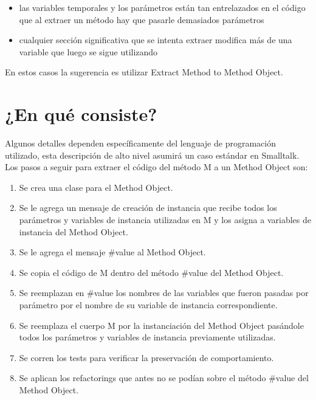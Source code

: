 \begin{itemize}
    \item las variables temporales y los parámetros están tan entrelazados en el código que al extraer 
    un método hay que pasarle demasiados parámetros
    \item cualquier sección significativa que se intenta extraer modifica más de una variable que
    luego se sigue utilizando
\end{itemize}

En estos casos la sugerencia es utilizar Extract Method to Method Object.


\section{¿En qué consiste?}

Algunos detalles dependen específicamente del lenguaje de programación utilizado, esta descripción
de alto nivel asumirá un caso estándar en Smalltalk. Los pasos a seguir para extraer el código
del método M a un Method Object son:

\begin{enumerate}
    \item Se crea una clase para el Method Object.
    \item Se le agrega un mensaje de creación de instancia que recibe todos los parámetros y
    variables de instancia utilizadas en M y los asigna a variables de instancia del Method Object.
    \item Se le agrega el mensaje \#value al Method Object.
    \item Se copia el código de M dentro del método \#value del Method Object.
    \item Se reemplazan en \#value los nombres de las variables que fueron pasadas por parámetro
    por el nombre de su variable de instancia correspondiente.
    \item Se reemplaza el cuerpo M por la instanciación del Method Object pasándole todos los
    parámetros y variables de instancia previamente utilizadas.
    \item Se corren los tests para verificar la preservación de comportamiento.
    \item Se aplican los refactorings que antes no se podían sobre el método \#value del Method
    Object.
\end{enumerate}

